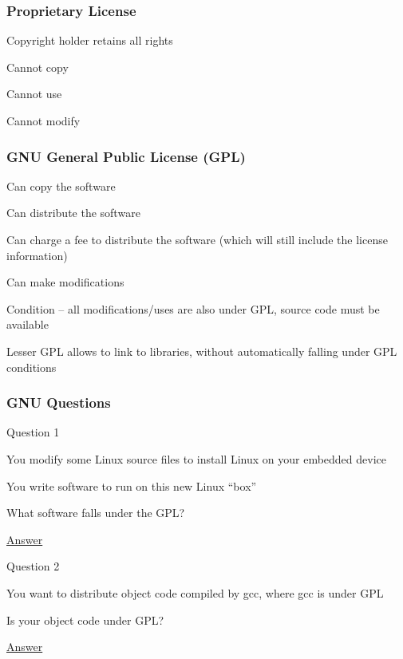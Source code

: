 \documentclass[t,12pt,numbers,fleqn]{beamer}
\begin{document}

\begin{frame}
\frametitle{Proprietary License}

\bi
\item Copyright holder retains all rights
\item Cannot copy
\item Cannot use
\item Cannot modify
\ei

\end{frame}


\begin{frame}
\frametitle{GNU General Public License (GPL)}

\bi
\item Can copy the software
\item Can distribute the software
\item Can charge a fee to distribute the software (which will still include the license information)
\item Can make modifications
\item Condition -- all modifications/uses are also under GPL, source
  code must be available
\item Lesser GPL allows to link to libraries, without automatically falling under
  GPL conditions
\ei

\end{frame}


\begin{frame}
\frametitle{GNU Questions}

\bi
\item Question 1
\bi
\item You modify some Linux source files to install Linux on your embedded
  device
\item You write software to run on this new Linux ``box''
\item What software falls under the GPL?
\item \href{http://www.softwarefreedom.org/resources/2008/compliance-guide.html}{Answer}
\ei
\item Question 2
\bi
\item You want to distribute object code compiled by gcc, where gcc is under GPL
\item Is your object code under GPL?
\item \href{https://www.gnu.org/licenses/gcc-exception-3.1-faq.en.html}{Answer}
\ei
\ei

\end{frame}
\end{document}
